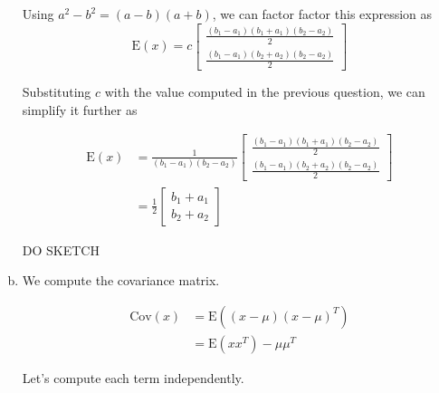 \documentclass[a4paper, 10pt, twoside]{article}
\begin{document}
\begin{enumerate}[a)]
          Using $a^2-b^2 = (a-b)(a+b)$, we can factor factor this expression as
          $$\mathrm{E}(x) = c\begin{bmatrix} \frac{(b_1-a_1)(b_1+a_1)(b_2-a_2)}{2} \\ \frac
                  {(b_1-a_1)(b_2+a_2)(b_2-a_2)}{2}\end{bmatrix}$$

          Substituting $c$ with the value computed in the previous question, we can simplify it further as

          \begin{align*}
              \mathrm{E}(x) & = \frac{1}{(b_1-a_1)(b_2-a_2)}\begin{bmatrix} \frac{(b_1-a_1)(b_1+a_1)(b_2-a_2)}{2} \\ \frac{(b_1-a_1)(b_2+a_2)(b_2-a_2)}{2} \end{bmatrix} \\
                            & = \frac{1}{2}\begin{bmatrix} b_1+a_1 \\ b_2+a_2 \end{bmatrix}
          \end{align*}

          DO SKETCH

    \item We compute the covariance matrix.

          \begin{align*}
              \mathrm{Cov}(x) & = \mathrm{E}((x-\mu)(x-\mu)^T) \\
                              & = \mathrm{E}(xx^T) - \mu\mu^T
          \end{align*}

          Let's compute each term independently.


\end{enumerate}
\end{document}
